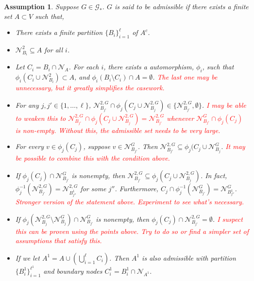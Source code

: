 \documentclass[12pt]{article}
\newcommand{\mc}{\mathcal}
\newcommand{\tr}{\textcolor{red}}
\newcommand{\neigh}[1]{\mc{N}_{#1}}				%
\newcommand{\dneigh}[1]{\mc{N}^2_{#1}}			%
\newcommand{\gneigh}[2]{\mc{N}^{#1}_{#2}}			%
\newcommand{\dgneigh}[2]{\mc{N}^{2,#1}_{#2}}		%
\newcommand{\indx}[1]{^{#1}}						%
\newcommand{\psize}{\ell}							%
\newcommand{\Gs}{\mc{G}_\ast}						%
\newtheorem{assu}{Assumption}
\begin{document}
\begin{assu}
Suppose \(G \in \Gs\). \(G\) is said to be admissible if there exists a finite set \(A \subset V\) such that,

\begin{itemize}
\item There exists a finite partition \(\{B_i\}_{i=1}^\psize\) of \(A^c\).

\item \(\dneigh{B_i} \subseteq A\) for all \(i\).

\item Let \(C_i = B_i\cap\neigh{A}\). For each \(i\), there exists a automorphism, \(\phi_i\), such that \(\phi_i(C_i\cup \dneigh{B_i}) \subset A\), and \(\phi_i(B_i\setminus C_i)\cap A = \emptyset\). \tr{The last one may be unnecessary, but it greatly simplifies the casework.}

\item For any \(j,j' \in \{1,\dots,\psize\}\), \(\dgneigh{G}{B_{j'}}\cap\phi_j(C_j\cup\dgneigh{G}{B_j}) \in \{\dgneigh{G}{B_{j'}},\emptyset\}\). \tr{I may be able to weaken this to \(\dgneigh{G}{B_{j'}}\cap\phi_j(C_j\cup\dgneigh{G}{B_j}) = \dgneigh{G}{B_{j'}}\) whenever \(\gneigh{G}{B_{j'}}\cap\phi_j(C_j)\) is non-empty. Without this, the admissible set needs to be very large.}

\item For every \(v \in \phi_j(C_j)\), suppose \(v \in \gneigh{G}{B_{j'}}\). Then \(\dgneigh{G}{B_{j'}}\subseteq \phi_j(C_j\cup\gneigh{G}{B_j}\). \tr{It may be possible to combine this with the condition above.}

\item If \(\phi_j(C_j) \cap \gneigh{G}{B_{j'}}\) is nonempty, then \(\dgneigh{G}{B_{j'}} \subseteq \phi_j(C_j\cup\dgneigh{G}{B_j})\). In fact, \(\phi_j^{-1}(\dgneigh{G}{B_{j'}}) = \dgneigh{G}{B_{j''}\indx{1}}\) for some \(j''\). Furthermore, \(C_j\cap\phi_j^{-1}(\gneigh{G}{B_{j'}}) = \gneigh{G}{B_{j''}\indx{1}}\). \tr{Stronger version of the statement above. Experiment to see what's necessary.}

\item If \(\phi_j(\dgneigh{G}{B_j}\setminus\gneigh{G}{B_j})\cap\gneigh{G}{B_{j'}}\) is nonempty, then \(\phi_j(C_j)\cap\dgneigh{G}{B_{j'}} = \emptyset\). \tr{I suspect this can be proven using the points above. Try to do so or find a simpler set of assumptions that satisfy this.}

\item If we let \(A\indx{1} = A\cup \left(\bigcup_{i=1}^\psize C_i\right)\). Then \(A\indx{1}\) is also admissible with partition \(\{B\indx{1}_i\}_{i=1}^{\psize\indx{1}}\) and boundary nodes \(C\indx{1}_i = B\indx{1}_i\cap \neigh{A\indx{1}}\).


\end{itemize}
\end{assu}
\end{document}
